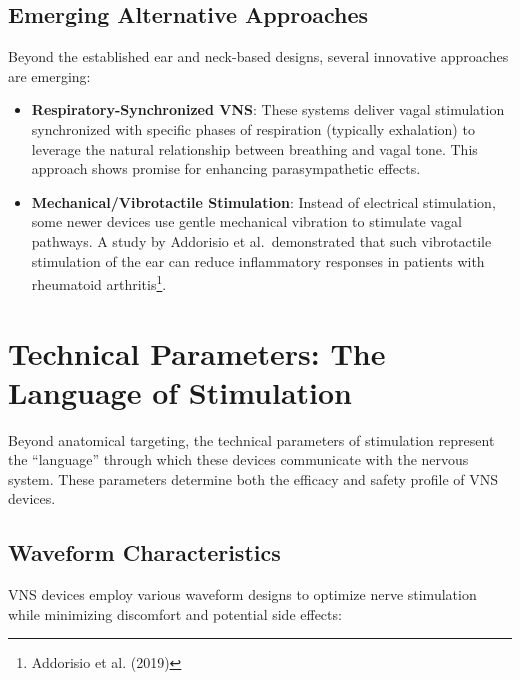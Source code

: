 \documentclass[
  Letterpaper,
]{scrbook}
\begin{document}
\subsection{Emerging Alternative
Approaches}\label{emerging-alternative-approaches}

Beyond the established ear and neck-based designs, several innovative
approaches are emerging:

\begin{itemize}
\item
  \textbf{Respiratory-Synchronized VNS}: These systems deliver vagal
  stimulation synchronized with specific phases of respiration
  (typically exhalation) to leverage the natural relationship between
  breathing and vagal tone. This approach shows promise for enhancing
  parasympathetic effects.
\item
  \textbf{Mechanical/Vibrotactile Stimulation}: Instead of electrical
  stimulation, some newer devices use gentle mechanical vibration to
  stimulate vagal pathways. A study by Addorisio et al.~demonstrated
  that such vibrotactile stimulation of the ear can reduce inflammatory
  responses in patients with rheumatoid arthritis\footnote{Addorisio et
    al. (2019)}.
\end{itemize}

\section{Technical Parameters: The Language of
Stimulation}\label{technical-parameters-the-language-of-stimulation}

Beyond anatomical targeting, the technical parameters of stimulation
represent the ``language'' through which these devices communicate with
the nervous system. These parameters determine both the efficacy and
safety profile of VNS devices.

\subsection{Waveform Characteristics}\label{waveform-characteristics}

VNS devices employ various waveform designs to optimize nerve
stimulation while minimizing discomfort and potential side effects:
\end{document}
